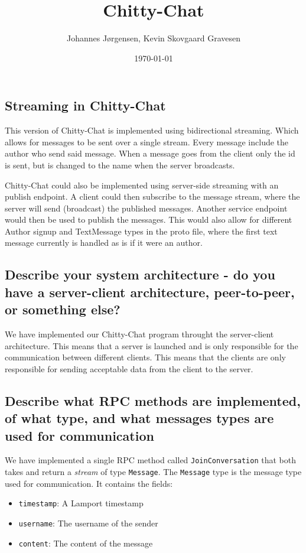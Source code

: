\documentclass[a4paper,11pt]{article}
\title{Chitty-Chat}
\author{Johannes Jørgensen, Kevin Skovgaard Gravesen}
\date{\today}
\begin{document}
 

\maketitle

\subsection*{Streaming in Chitty-Chat}
This version of Chitty-Chat is implemented using bidirectional streaming. Which allows for messages to be sent over a single stream.
Every message include the author who send said message. When a message goes from the client only the id is sent, but is changed to the name when the server broadcasts.

Chitty-Chat could also be implemented using server-side streaming with an publish endpoint.
A client could then subscribe to the message stream, where the server will send (broadcast) the published messages.
Another service endpoint would then be used to publish the messages.
This would also allow for different Author signup and TextMessage types in the proto file, where the first text message currently is handled as is if it were an author.

\subsection*{Describe your system architecture - do you have a server-client architecture, peer-to-peer, or something else?}
We have implemented our Chitty-Chat program throught the server-client architecture. 
This means that a server is launched and is only responsible for the communication between different clients. This means that the clients are only responsible for
sending acceptable data from the client to the server.
\subsection*{Describe what  RPC methods are implemented, of what type, and what messages types are used for communication}
We have implemented a single RPC method called \verb|JoinConversation| that both takes and return a \textit{stream} of type \verb|Message|.
The \verb|Message| type is the message type used for communication. It contains the fields:
\begin{itemize}
    \item \verb|timestamp|: A Lamport timestamp
    \item \verb|username|: The username of the sender
    \item \verb|content|: The content of the message
\end{itemize} 
\end{document}

